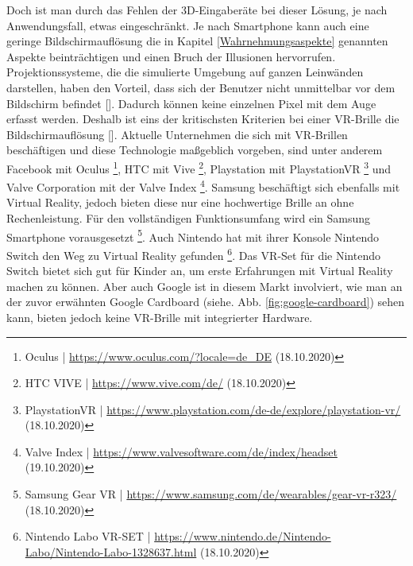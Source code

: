 \documentclass[a4paper,12pt,oneside]{article}
\begin{document}
        Doch ist man durch das Fehlen der 3D-Eingaberäte bei dieser Lösung, je
        nach Anwendungsfall, etwas eingeschränkt. Je nach Smartphone kann auch eine geringe
        Bildschirmauflösung die in Kapitel \ref{Wahrnehmungsaspekte} genannten Aspekte
        beinträchtigen und einen Bruch der Illusionen hervorrufen.
        Projektionssysteme, die die simulierte Umgebung auf ganzen Leinwänden darstellen,
        haben den Vorteil, dass sich der Benutzer nicht unmittelbar vor dem Bildschirm
        befindet [\cite[134]{Dorner2013}]. Dadurch können keine einzelnen Pixel mit dem Auge 
        erfasst werden. Deshalb ist eins der kritischsten Kriterien bei einer VR-Brille 
        die Bildschirmauflösung [\cite[134]{Dorner2013}].
        Aktuelle Unternehmen die sich mit VR-Brillen beschäftigen und diese Technologie
        maßgeblich vorgeben, sind unter anderem  Facebook mit Oculus
        \footnote{Oculus | \url{https://www.oculus.com/?locale=de_DE} (18.10.2020)}, 
        HTC mit Vive \footnote{HTC VIVE | \url{https://www.vive.com/de/} (18.10.2020)},
        Playstation mit PlaystationVR
        \footnote{PlaystationVR | \url{https://www.playstation.com/de-de/explore/playstation-vr/} (18.10.2020)}
        und Valve Corporation mit der Valve Index
        \footnote{Valve Index | \url{https://www.valvesoftware.com/de/index/headset} (19.10.2020)}.
        Samsung beschäftigt sich ebenfalls mit Virtual
        Reality, jedoch bieten diese nur eine hochwertige Brille an ohne Rechenleistung.
        Für den vollständigen Funktionsumfang wird ein Samsung Smartphone vorausgesetzt
        \footnote{Samsung Gear VR | \url{https://www.samsung.com/de/wearables/gear-vr-r323/} (18.10.2020)}.
        Auch Nintendo hat mit ihrer Konsole Nintendo Switch den Weg zu Virtual Reality
        gefunden
        \footnote{Nintendo Labo VR-SET | \url{https://www.nintendo.de/Nintendo-Labo/Nintendo-Labo-1328637.html} (18.10.2020)}.
        Das VR-Set für die Nintendo Switch bietet sich gut für Kinder an, um erste 
        Erfahrungen mit Virtual Reality machen zu können.
        Aber auch Google ist in diesem Markt involviert, wie man an der zuvor erwähnten
        Google Cardboard (siehe. Abb. \ref{fig:google-cardboard}) sehen kann, bieten jedoch keine 
        VR-Brille mit integrierter Hardware.
\end{document}
